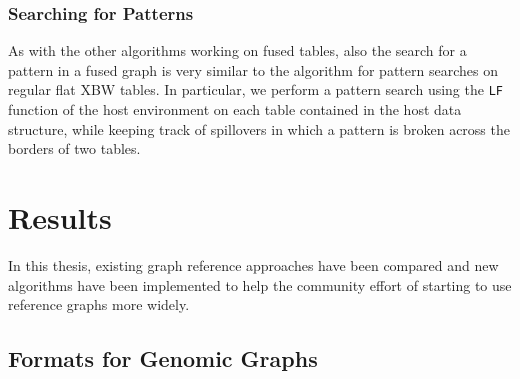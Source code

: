 \documentclass[a4paper,12pt,twoside,BCOR=10mm]{scrbook}
\begin{document}

\subsection{Searching for Patterns}

As with the other algorithms working on fused tables, also the search for a pattern
in a fused graph is very similar to the algorithm for pattern searches on regular flat XBW tables.
In particular, we perform a pattern search using the \texttt{LF} function of the host environment on each table contained
in the host data structure, while keeping track of spillovers in which a pattern is broken
across the borders of two tables.


\chapter{Results}
%

In this thesis, existing graph reference approaches have been compared
and new algorithms have been implemented to help the community effort
of starting to use reference graphs more widely.

\section{Formats for Genomic Graphs}
\label{sec:results_data_formats}
%
\end{document}
